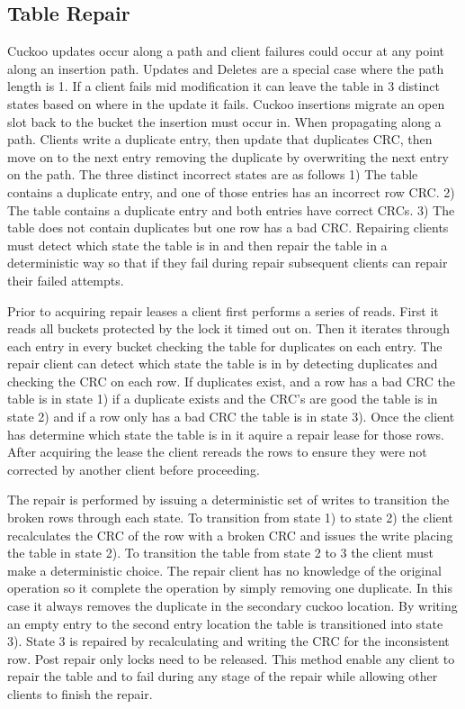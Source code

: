\subsection{Table Repair} Cuckoo updates occur along a path
and client failures could occur at any point along an
insertion path. Updates and Deletes are a special case where
the path length is 1. If a client fails mid modification it
can leave the table in 3 distinct states based on where in
the update it fails. Cuckoo insertions migrate an open slot
back to the bucket the insertion must occur in. When
propagating along a path. Clients write a duplicate entry,
then update that duplicates CRC, then move on to the next
entry removing the duplicate by overwriting the next entry
on the path. The three distinct incorrect states are as
follows 1) The table contains a duplicate entry, and one of
those entries has an incorrect row CRC. 2) The table
contains a duplicate entry and both entries have correct
CRCs. 3) The table does not contain duplicates but one row
has a bad CRC. Repairing clients must detect which state the
table is in and then repair the table in a deterministic way
so that if they fail during repair subsequent clients can
repair their failed attempts.

Prior to acquiring repair leases a client first performs a
series of reads. First it reads all buckets protected by the
lock it timed out on. Then it iterates through each entry in
every bucket checking the table for duplicates on each
entry. The repair client can detect which state the table is
in by detecting duplicates and checking the CRC on each row.
If duplicates exist, and a row has a bad CRC the table is in
state 1) if a duplicate exists and the CRC's are good the
table is in state 2) and if a row only has a bad CRC the
table is in state 3). Once the client has determine which
state the table is in it aquire a repair lease for those
rows. After acquiring the lease the client rereads the rows
to ensure they were not corrected by another client before
proceeding. 

The repair is performed by issuing a deterministic set of
writes to transition the broken rows through each state. To
transition from state 1) to state 2) the client recalculates
the CRC of the row with a broken CRC and issues the write
placing the table in state 2). To transition the table from
state 2 to 3 the client must make a deterministic choice.
The repair client has no knowledge of the original operation
so it complete the operation by simply removing one
duplicate. In this case it always removes the duplicate in
the secondary cuckoo location. By writing an empty entry to
the second entry location the table is transitioned into
state 3). State 3 is repaired by recalculating and writing
the CRC for the inconsistent row. Post repair only locks
need to be released. This method enable any client to repair
the table and to fail during any stage of the repair while
allowing other clients to finish the repair.

